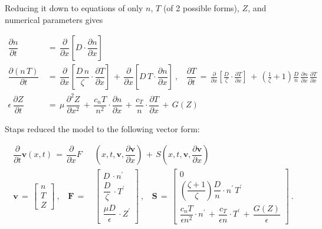 \documentclass[a4paper,8pt]{article}
\begin{document}
\normalsize

Reducing it down to equations of only \(n\), \(T\) (of 2 possible
forms), \(Z\), and numerical parameters gives \small

\begin{align}
    \dfrac{\partial n}{\partial t} \,&=\, \dfrac{\partial}{\partial x}\left[D \cdot \dfrac{\partial n}{\partial x}\right] \\
    \dfrac{\partial(n\,T)}{\partial t} \,&=\, \dfrac{\partial}{\partial x}\left[\dfrac{D\,n}{\zeta} \cdot \dfrac{\partial T}{\partial x}\right] \,+\, \dfrac{\partial}{\partial x}\left[D\,T \cdot \dfrac{\partial n}{\partial x}\right]~, ~~~~ \dfrac{\partial T}{\partial t} \,=\, \frac{\partial }{\partial x}\left[\frac{D}{\zeta} \cdot \frac{\partial T}{\partial x}\right] \,+\, \left(\frac{1}{\zeta} + 1\right) \frac{D}{n} \, \frac{\partial n}{\partial x} \, \frac{\partial T}{\partial x} \\
    \epsilon \, \dfrac{\partial Z}{\partial t} \,&=\, \mu \, \dfrac{\partial^2 Z}{\partial x^2} \,+\, \dfrac{c_n T}{n^2} \cdot \dfrac{\partial n}{\partial x} \,+\, \dfrac{c_T}{n} \cdot \dfrac{\partial T}{\partial x} \,+\, G(Z)
\end{align}

\normalsize

Staps reduced the model to the following vector form: \small

\begin{align}
    \dfrac{\partial}{\partial t} \mathbf{v}(x,t) \,=\, \dfrac{\partial}{\partial x} F&\left(x, t, \mathbf{v}, \dfrac{\partial\mathbf{v}}{\partial x}\right) \,+\, S\left(x, t, \mathbf{v}, \dfrac{\partial\mathbf{v}}{\partial x}\right) \\
\mathbf{v} \,=\,\begin{bmatrix} n \\[1ex] T \\[1ex] Z \end{bmatrix}~,~~~~
\mathbf{F} \,=\, &\begin{bmatrix}
            D\,\cdot n^\prime \\[1ex]
            \dfrac{D}{\zeta}\,\cdot T^\prime \\[2ex]
            \dfrac{\mu D}{\epsilon}\,\cdot Z^\prime
            \end{bmatrix}~,~~~~
\mathbf{S} \,=\, \begin{bmatrix}
            0 \\[1ex]
            \left(\dfrac{\zeta + 1}{\zeta}\right) \dfrac{D}{n} \cdot n^\prime \, T^\prime \\[2ex]
            \dfrac{c_n T}{\epsilon n^2} \cdot n^\prime \,+\, \dfrac{c_T}{\epsilon n} \cdot T^\prime \,+\, \dfrac{G(Z)}{\epsilon}
            \end{bmatrix}~.
\end{align}
\end{document}
